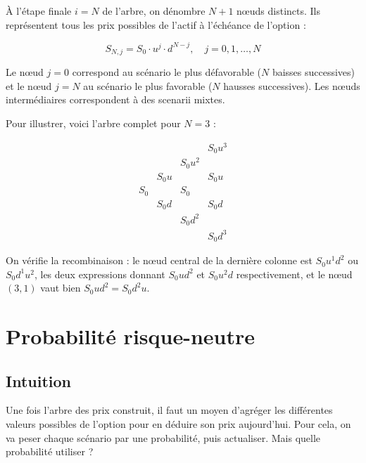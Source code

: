 \documentclass[11pt]{report}
\begin{document}
À l'étape finale $i = N$ de l'arbre, on dénombre $N+1$ nœuds distincts. Ils
représentent tous les prix possibles de l'actif à l'échéance de l'option :

\begin{equation}
    S_{N,j} = S_0 \cdot u^j \cdot d^{N-j}, \quad j = 0, 1, \ldots, N
\end{equation}

Le nœud $j = 0$ correspond au scénario le plus défavorable ($N$ baisses
successives) et le nœud $j = N$ au scénario le plus favorable ($N$ hausses
successives). Les nœuds intermédiaires correspondent à des scenarii mixtes.

Pour illustrer, voici l'arbre complet pour $N = 3$ :

\begin{equation*}
\begin{array}{ccccccc}
                &           &           & S_0 u^3   \\
                &           & S_0 u^2   &           \\
                & S_0 u     &           & S_0 u     \\
S_0             &           & S_0       &           \\
                & S_0 d     &           & S_0 d     \\
                &           & S_0 d^2   &           \\
                &           &           & S_0 d^3
\end{array}
\end{equation*}

On vérifie la recombinaison : le nœud central de la dernière colonne est
$S_0 u^1 d^2$ ou $S_0 d^1 u^2$, les deux expressions donnant $S_0 u d^2$ et
$S_0 u^2 d$ respectivement, et le nœud $(3, 1)$ vaut bien $S_0 u d^2 = S_0 d^2 u$.

\section{Probabilité risque-neutre}
\label{sec:proba_risque_neutre}

\subsection*{Intuition}

Une fois l'arbre des prix construit, il faut un moyen d'agréger les différentes
valeurs possibles de l'option pour en déduire son prix aujourd'hui. Pour cela,
on va \og peser \fg{} chaque scénario par une probabilité, puis actualiser.
Mais quelle probabilité utiliser ?
\end{document}
